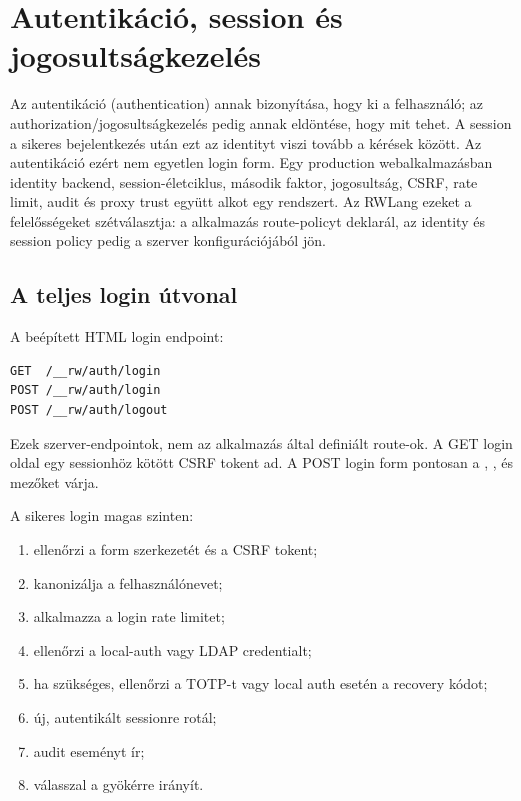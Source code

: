 \chapter{Autentikáció, session és jogosultságkezelés}

Az autentikáció (authentication) annak bizonyítása, hogy ki a felhasználó; az authorization/jogosultságkezelés pedig annak eldöntése, hogy mit tehet. A session a sikeres bejelentkezés után ezt az identityt viszi tovább a kérések között. Az autentikáció ezért nem egyetlen login form. Egy production webalkalmazásban identity backend, session-életciklus, második faktor, jogosultság, CSRF, rate limit, audit és proxy trust együtt alkot egy rendszert. Az RWLang ezeket a felelősségeket szétválasztja: a  alkalmazás route-policyt deklarál, az identity és session policy pedig a szerver konfigurációjából jön.

\section{A teljes login útvonal}

A beépített HTML login endpoint:

\begin{lstlisting}
GET  /__rw/auth/login
POST /__rw/auth/login
POST /__rw/auth/logout
\end{lstlisting}

Ezek szerver-endpointok, nem az alkalmazás által definiált route-ok. A GET login oldal egy sessionhöz kötött CSRF tokent ad. A POST login form pontosan a , ,  és  mezőket várja.

A sikeres login magas szinten:

\begin{enumerate}
  \item ellenőrzi a form szerkezetét és a CSRF tokent;
  \item kanonizálja a felhasználónevet;
  \item alkalmazza a login rate limitet;
  \item ellenőrzi a local-auth vagy LDAP credentialt;
  \item ha szükséges, ellenőrzi a TOTP-t vagy local auth esetén a recovery kódot;
  \item új, autentikált sessionre rotál;
  \item audit eseményt ír;
  \item {} válasszal a gyökérre irányít.
\end{enumerate}

